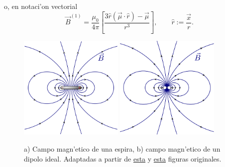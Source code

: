 o, en notaci'on vectorial
\begin{equation}
\boxed{\vec{B}^{(1)}=\frac{\mu_0}{4\pi}\left[\frac{3\hat{r}(\vec{\mu}
\cdot\hat{r}) -\vec{\mu}}{r^3}\right] , \qquad \hat{r}:=\frac{\vec{x}}{r}.}
\end{equation}
\begin{figure}[!h]
\centerline{\includegraphics[height=5cm]{fig/fig-campo-magnetico-espira.pdf}\hspace{2cm}
\includegraphics[height=5cm]{fig/fig-campo-dipolo-magnetico.pdf}}
\caption{a) Campo magn'etico de una espira, b) campo magn'etico de un dipolo ideal. Adaptadas a partir de \href{http://commons.wikimedia.org/wiki/File:VFPt_dipole_point.svg}{esta} y \href{http://commons.wikimedia.org/wiki/File:VFPt_dipole_magnetic3.svg}{esta} figuras originales.}
\label{fig:dipmag}
\end{figure}


